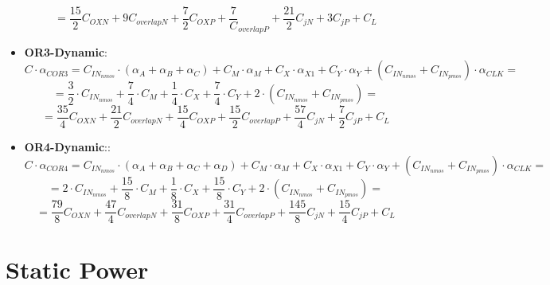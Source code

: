\documentclass[12pt,  english, makeidx, a4paper, titlepage, oneside]{article}
\begin{document}
\begin{itemize}
\begin{equation}
	=\frac{15}{2}C_{OXN}+{9}C_{overlapN}+\frac{7}{2}C_{OXP}+\frac{7}C_{overlapP}+\frac{21}{2}C_{jN}+{3}C_{jP}+C_L
\end{equation}	
	\item \textbf{OR3-Dynamic}:
	\begin{equation}
	C \cdot \alpha_{COR3} = C_{IN_{nmos}} \cdot (\alpha_A + \alpha_B+ \alpha_C )+ C_M \cdot \alpha_M+C_X \cdot \alpha_{X1}+ C_Y \cdot \alpha_Y+ (C_{IN_{nmos}}+C_{IN_{pmos}}) \cdot \alpha_{CLK}=
	\end{equation}	
	\begin{equation}
	=\frac{3}{2} \cdot C_{IN_{nmos}} +\frac{7}{4}\cdot C_{M} +\frac{1}{4} \cdot C_X+\frac{7}{4}\cdot C_Y+2 \cdot (C_{IN_{nmos}}+C_{IN_{pmos}})=
	\end{equation}
\begin{equation}
	=\frac{35}{4}C_{OXN}+\frac{21}{2}C_{overlapN}+\frac{15}{4}C_{OXP}+\frac{15}{2}C_{overlapP}+\frac{57}{4}C_{jN}+\frac{7}{2}C_{jP}+C_L
\end{equation}
	\item \textbf{OR4-Dynamic}::
	\begin{equation}
	C \cdot \alpha _{COR4} = C_{IN_{nmos}} \cdot (\alpha_A + \alpha_B+ \alpha_C+ \alpha_D )+ C_M \cdot \alpha_M+C_X \cdot \alpha_{X1}+ C_Y \cdot \alpha_Y+ (C_{IN_{nmos}}+C_{IN_{pmos}}) \cdot \alpha_{CLK}=
	\end{equation}	
	\begin{equation}
	={2} \cdot C_{IN_{nmos}} +\frac{15}{8}\cdot C_{M} +\frac{1}{8} \cdot C_X+\frac{15}{8}\cdot C_Y+2 \cdot (C_{IN_{nmos}}+C_{IN_{pmos}})=
	\end{equation}		
\begin{equation}
	=\frac{79}{8}C_{OXN}+\frac{47}{4}C_{overlapN}+\frac{31}{8}C_{OXP}+\frac{31}{4}C_{overlapP}+\frac{145}{8}C_{jN}+\frac{15}{4}C_{jP}+C_L
\end{equation}	
	\end{itemize}
\newpage
\section{Static Power}
\end{document}
